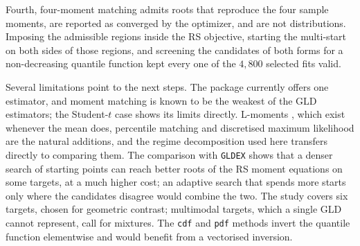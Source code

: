 Fourth, four-moment matching admits roots that reproduce the four sample moments,
are reported as converged by the optimizer, and are not distributions. Imposing
the admissible regions inside the RS objective, starting the multi-start on both
sides of those regions, and screening the candidates of both forms for a
non-decreasing quantile function kept every one of the $4{,}800$ selected fits
valid.

Several limitations point to the next steps. The package currently offers one
estimator, and moment matching is known to be the weakest of the GLD estimators;
the Student-$t$ case shows its limits directly. L-moments
\parencite{KarvanenNuutinen2008}, which exist whenever the mean does, percentile
matching \parencite{KarianDudewicz1999} and discretised maximum likelihood
\parencite{Su2007CSDA} are the natural additions, and the regime decomposition
used here transfers directly to comparing them. The comparison with
\texttt{GLDEX} shows that a denser search of starting points can reach better
roots of the RS moment equations on some targets, at a much higher cost; an
adaptive search that spends more starts only where the candidates disagree would
combine the two. The study covers six targets, chosen for geometric contrast;
multimodal targets, which a single GLD cannot represent, call for mixtures. The
\texttt{cdf} and \texttt{pdf} methods invert the quantile function elementwise
and would benefit from a vectorised inversion.
